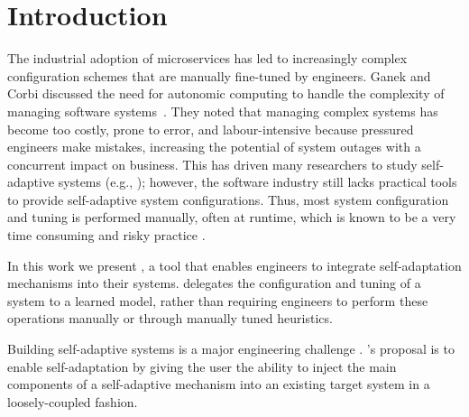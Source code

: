 
\section{Introduction}
\label{sec:introduction}

The industrial adoption of microservices has led to increasingly complex configuration schemes that are manually fine-tuned by engineers. Ganek and Corbi discussed the need for autonomic computing to handle the complexity of managing software systems~\cite{ganek_dawning_2003}. They noted that managing complex systems has become too costly, prone to error, and labour-intensive because pressured engineers make mistakes, increasing the potential of system outages with a concurrent impact on business. This has driven many researchers to study self-adaptive systems (e.g., \cite{porter_rex:_2016, andrew_pavlo_self-driving_2017, salehie_self-adaptive_2009, ganapathi_predicting_2009, herbst_self-adaptive_2014, faniyi_architecting_2014}); however, the software industry still lacks practical tools to provide self-adaptive system configurations. Thus, most system configuration and tuning is performed manually, often at runtime, which is known to be a very time consuming and risky practice \cite{ganek_dawning_2003, using_prob_reasoning_automate_software_tuning, de_lemos_software_2013}.

In this work we present \projectname{}, a tool that enables engineers to integrate self-adaptation mechanisms into their systems. \projectname{} delegates the configuration and tuning of a system to a learned model, rather than requiring engineers to perform these operations manually or through manually tuned heuristics.

Building self-adaptive systems is a major engineering challenge \cite{brun_engineering_2009}. \projectname{}'s proposal is to enable self-adaptation by giving the user the ability to inject the main components of a self-adaptive mechanism into an existing target system in a loosely-coupled fashion.

